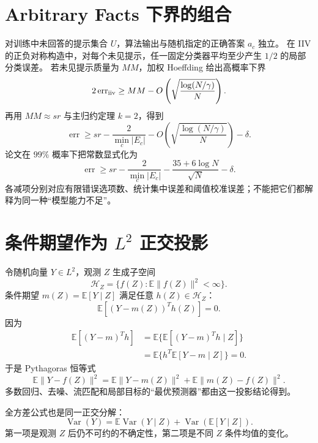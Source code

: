 \documentclass[11pt]{article}
\numberwithin{equation}{section}
\newcommand{\E}{\mathbb{E}}
\newcommand{\1}{\mathbf{1}}
\newcommand{\Var}{\operatorname{Var}}
\begin{document}
\section{Arbitrary Facts 下界的组合}

对训练中未回答的提示集合 $U$，算法输出与随机指定的正确答案 $a_c$ 独立。
在 IIV 的正负对称构造中，对每个未见提示，任一固定分类器平均至少产生 $1/2$ 的局部分类误差。
若未见提示质量为 $MM$，加权 Hoeffding 给出高概率下界
\begin{equation}
 2\operatorname{err}_{\rm iiv}
 \ge MM-O\left(\sqrt{\frac{\log(N/\gamma)}N}\right).
\end{equation}
再用 $MM\approx sr$ 与主归约定理 $k=2$，得到
\begin{equation}
 \operatorname{err}
 \ge sr-\frac{2}{\min_c|E_c|}
 -O\left(\sqrt{\frac{\log(N/\gamma)}N}\right)-\delta.
\end{equation}
论文在 $99\%$ 概率下把常数显式化为
\begin{equation}
 \operatorname{err}\ge sr-\frac2{\min_c|E_c|}
 -\frac{35+6\log N}{\sqrt N}-\delta.
\end{equation}
各减项分别对应有限错误选项数、统计集中误差和阈值校准误差；不能把它们都解释为同一种“模型能力不足”。

\section{条件期望作为 $L^2$ 正交投影}

令随机向量 $Y\in L^2$，观测 $Z$ 生成子空间
\begin{equation}
 \mathcal H_Z=\{f(Z):\E\|f(Z)\|^2<\infty\}.
\end{equation}
条件期望 $m(Z)=\E[Y\mid Z]$ 满足任意 $h(Z)\in\mathcal H_Z$：
\begin{equation}
 \E[(Y-m(Z))^Th(Z)]=0.
\end{equation}
因为
\begin{align}
 \E[(Y-m)^Th]
 &=\E\{\E[(Y-m)^Th\mid Z]\}\\
 &=\E\{h^T\E[Y-m\mid Z]\}=0.
\end{align}
于是 Pythagoras 恒等式
\begin{equation}
 \E\|Y-f(Z)\|^2
 =\E\|Y-m(Z)\|^2+\E\|m(Z)-f(Z)\|^2.
\end{equation}
多数回归、去噪、流匹配和局部目标的“最优预测器”都由这一投影结论得到。

全方差公式也是同一正交分解：
\begin{equation}
 \Var(Y)=\E\Var(Y\mid Z)+\Var(\E[Y\mid Z]).
\end{equation}
第一项是观测 $Z$ 后仍不可约的不确定性，第二项是不同 $Z$ 条件均值的变化。
\end{document}
